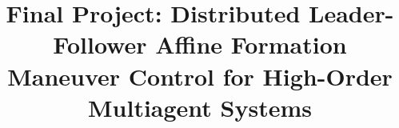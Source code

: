 \documentclass[conference]{IEEEtran}
\begin{document}
\title{Final Project: Distributed Leader-Follower Affine Formation Maneuver Control for High-Order Multiagent Systems}

\author{
}



\date{{}}
\maketitle
%     





% 
% 
\end{document}
